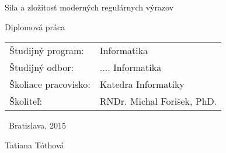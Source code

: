 \documentclass[a4paper,12pt,openany,oneside,header=optiontohead]{scrbook} %
\def\mftitle{Sila a zložitosť moderných regulárnych výrazov}
\def\mfthesistype{Diplomová práca}
\def\mfauthor{Tatiana Tóthová}
\def\mfadvisor{RNDr. Michal Forišek, PhD.}
\def\mfdate{2015}
\def\mfplacedate{Bratislava, \mfdate}
\begin{document}
\vfill
\begin{center}
\begin{minipage}{1\textwidth}
\bigskip\bigskip
\begin{center}
\linespread{1}\LARGE\sc\mftitle
\end{center}
\smallskip
\centerline{\mfthesistype}
\bigskip
\bigskip
\bigskip\bigskip
\end{minipage}
\end{center}
\vfill
\begin{minipage}{0.8\textwidth}
\begin{tabular}{l l}
Študijný program:& Informatika \\
Študijný odbor:& .... Informatika \\
Školiace pracovisko:& Katedra Informatiky\\
Školiteľ:&   \mfadvisor \\
\end{tabular}
\end{minipage}
\begin{center}
\end{center}
\vfill
{\bf
\begin{minipage}{0.4\textwidth}
\begin{flushleft} \large
~\mfplacedate
\end{flushleft}
\end{minipage}
\begin{minipage}{0.59\textwidth}
\begin{flushright} \large
\indent\mfauthor
\end{flushright}
\end{minipage}
}
\eject %


% 
% 
% 


\end{document}
